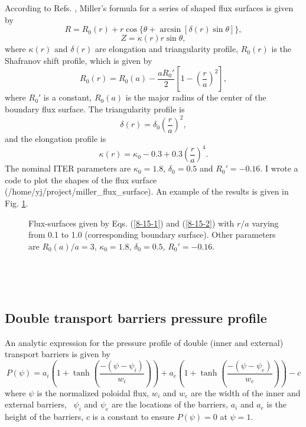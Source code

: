 \documentclass{llncs}
\begin{document}
According to Refs. {\cite{chen2010,miller1998}}, Miller's formula for a series
of shaped flux surfaces is given by
\begin{equation}
  \label{8-15-1} R = R_0 (r) + r \cos \{ \theta + \arcsin [\delta (r) \sin
  \theta] \},
\end{equation}
\begin{equation}
  \label{8-15-2} Z = \kappa (r) r \sin \theta,
\end{equation}
where $\kappa (r)$ and $\delta (r)$ are elongation and triangularity profile,
$R_0 (r)$ is the Shafranov shift profile, which is given by
\begin{equation}
  R_0 (r) = R_0 (a) - \frac{a R_0'}{2} \left[ 1 - \left( \frac{r}{a} \right)^2
  \right],
\end{equation}
where $R_0'$ is a constant, $R_0 (a)$ is the major radius of the center of the
boundary flux surface. The triangularity profile is
\begin{equation}
  \delta (r) = \delta_0  \left( \frac{r}{a} \right)^2,
\end{equation}
and the elongation profile is
\begin{equation}
  \kappa (r) = \kappa_0 - 0.3 + 0.3 \left( \frac{r}{a} \right)^4 .
\end{equation}
The nominal ITER parameters are $\kappa_0 = 1.8$, $\delta_0 = 0.5$ and $R_0' =
- 0.16$. I wrote a code to plot the shapes of the flux surface
(/home/yj/project/miller\_flux\_surface). An example of the results is given
in Fig. \ref{8-15-4}.

\begin{figure}[h]
  
  \caption{\label{8-15-4}Flux-surfaces given by Eqs. (\ref{8-15-1}) and
  (\ref{8-15-2}) with $r / a$ varying from 0.1 to 1.0 (corresponding boundary
  surface). Other parameters are $R_0 (a) / a = 3$, $\kappa_0 = 1.8$,
  $\delta_0 = 0.5$, $R_0' = - 0.16$.}
\end{figure}

\

\

\subsection{Double transport barriers pressure profile}

An analytic expression for the pressure profile of double (inner and external)
transport barriers is given by
\begin{equation}
  \label{5-26-5} P (\psi) = a_i \left( 1 + \tanh \left( \frac{- (\psi -
  \psi_i)}{w_i} \right) \right) + a_e \left( 1 + \tanh \left( \frac{- (\psi -
  \psi_e)}{w_e} \right) \right) - c
\end{equation}
where $\psi$ is the normalized poloidal flux, $w_i$ and $w_e$ are the width of
the inner and external barriers, \ $\psi_i$ and $\psi_e$ are the locations of
the barriers, $a_i$ and $a_e$ is the height of the barriers, $c$ is a constant
to ensure $P (\psi) = 0$ at $\psi = 1$.
\end{document}
